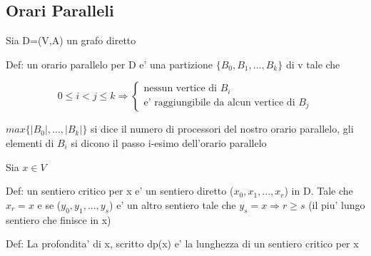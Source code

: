 \documentclass{article}
\begin{document}
        \subsection{Orari Paralleli}
        \begin{flushleft}
          Sia D=(V,A) un grafo diretto
        \end{flushleft}
        \begin{flushleft}
          Def: un orario parallelo per D e' una partizione $\{B_0,B_1,...,B_k\}$ di v tale che 
        \end{flushleft}
        \begin{equation*}
          0 \leq i < j \leq k \Rightarrow \begin{cases}
            \text{nessun vertice di $B_i$} \\ 
            \text{e' raggiungibile da alcun vertice di $B_j$}
          \end{cases}
        \end{equation*}
        \begin{flushleft}
          $max\{\mid B_0\mid ,...,\mid B_k\mid \}$ si dice il numero di processori del nostro orario parallelo,
          gli elementi di $B_i$ si dicono il passo i-esimo dell'orario parallelo
        \end{flushleft}
        Sia $x \in V$
        \begin{flushleft}
          Def: un sentiero critico per x e' un sentiero diretto ($x_0,x_1,...,x_r$) in D. Tale che $x_r=x$ e se ($y_0,y_1,...,y_s$) e' 
          un altro sentiero tale che $y_s=x\Rightarrow r \geq s$
          (il piu' lungo sentiero che finisce in x)
        \end{flushleft}
        \begin{flushleft}
          Def: La profondita' di x, scritto dp(x) e' la lunghezza di un sentiero critico per x
        \end{flushleft}







      
\end{document}
